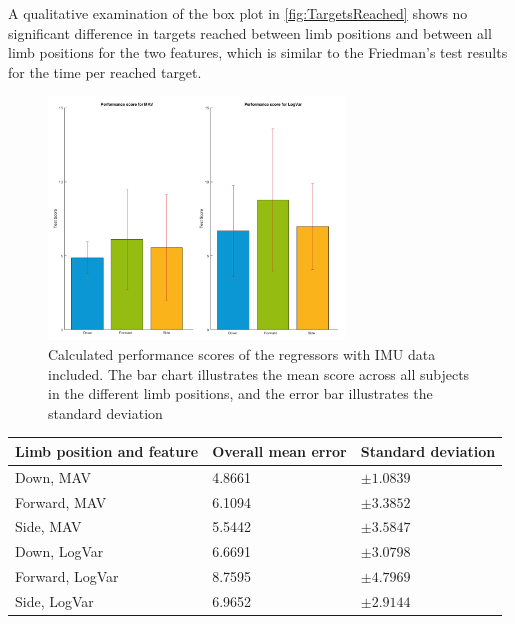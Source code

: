 A qualitative examination of the box plot in \ref{fig:TargetsReached} shows no significant difference in targets reached between limb positions and between all limb positions for the two features, which is similar to the Friedman's test results for the time per reached target.

\begin{figure}[H]
	\includegraphics[width=0.7\textwidth]{figures/results/GotItTimeIMU}  %
	\caption{Calculated performance scores of the regressors with IMU data included. The bar chart illustrates the mean score across all subjects in the different limb positions, and the error bar illustrates the standard deviation}
	\label{fig:gotItTimeIMU}  %
\end{figure}

	\begin{center}
		\begin{tabular}{l l l}
			\toprule
			\textbf{Limb position and feature} & \textbf{Overall mean error} & \textbf{Standard deviation}\\
			\midrule
			Down, MAV & 4.8661 & $\pm 1.0839$ \\
			Forward, MAV & 6.1094 & $\pm 3.3852$ \\
			Side, MAV & 5.5442 & $\pm 3.5847$ \\
			Down, LogVar & 6.6691 & $\pm 3.0798$ \\
			Forward, LogVar & 8.7595 & $\pm 4.7969$ \\
			Side, LogVar & 6.9652 & $\pm 2.9144$ \\
			\bottomrule
		\end{tabular}
	\end{center}

